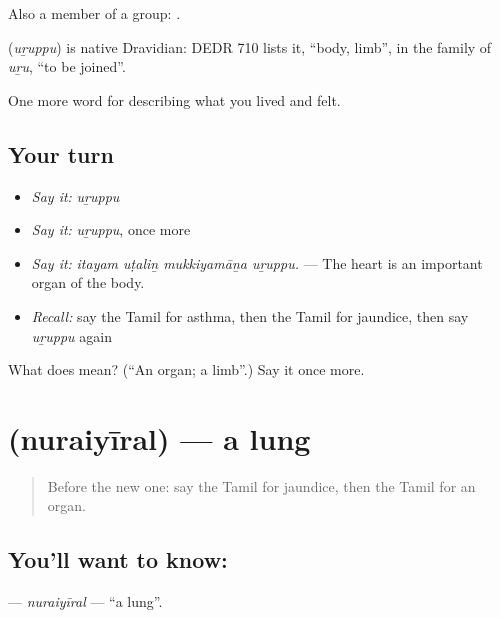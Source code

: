 Also a member of a group:  .

\begin{cousinweb}
\textbf{} (\emph{uṟuppu}) is native Dravidian: DEDR 710 lists it, \textquotedblleft{}body, limb\textquotedblright{}, in the family of  \emph{uṟu}, \textquotedblleft{}to be joined\textquotedblright{}.
\end{cousinweb}

\begin{grammarlens}[title={What you've built}]
One more word for describing what you lived and felt.
\end{grammarlens}

\subsection*{Your turn}
\begin{itemize}
\raggedright
  \item \emph{Say it:} \emph{uṟuppu}
  \item \emph{Say it:} \emph{uṟuppu}, once more
  \item \emph{Say it:} \emph{itayam uṭaliṉ mukkiyamāṉa uṟuppu.} — The heart is an important organ of the body.
  \item \emph{Recall:} say the Tamil for asthma, then the Tamil for jaundice, then say \emph{uṟuppu} again
\end{itemize}

\begin{tcolorbox}[breakable,colback=teal!4,colframe=teal!35!black,title={Before you move on}]
What does  mean? (\textquotedblleft{}An organ; a limb\textquotedblright{}.) Say it once more.
\end{tcolorbox}
\section[\texorpdfstring{\ta{நுரையீரல்} (nuraiyīral)}{நுரையீரல் (nuraiyīral)}]{ (nuraiyīral) — a lung}

\label{lesson:TA-C478-nuraiyiral}



\begin{quote}
Before the new one: say the Tamil for jaundice, then the Tamil for an organ.
\end{quote}

\subsection*{You'll want to know: }
\textbf{} — \emph{nuraiyīral} — \textquotedblleft{}a lung\textquotedblright{}.


